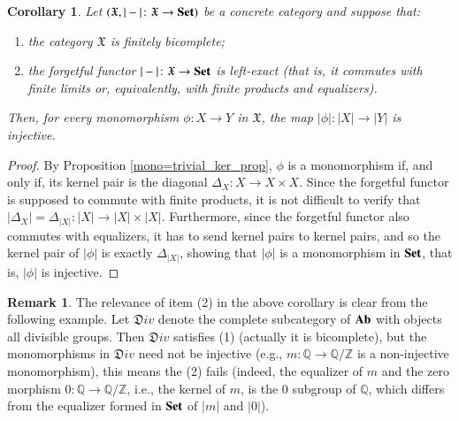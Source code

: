 \documentclass[12pt]{article}
\newtheorem{corollary}[lemma]{Corollary}
\theoremstyle{definition}
\newtheorem{remark}[lemma]{Remark}
\def\Z{\mathbb Z}
\def\Q{\mathbb Q}
\def\X{\mathfrak X}
\newcommand{\Set}{\textbf{\textup{Set}}}
\newcommand{\Ab}{\textbf{\textup{Ab}}}
\numberwithin{equation}{section}
\begin{document}
\begin{corollary}\label{mono_is_injective2}
Let $(\X,|-|\colon \X\to \Set)$ be a concrete category and suppose that:
\begin{enumerate}[\rm (1)]
\item the category $\X$ is finitely bicomplete; 
\item the forgetful functor $|-|\colon \X\to \Set$ is left-exact (that is, it commutes with finite limits or, equivalently, with finite products and equalizers).
\end{enumerate}
Then, for every monomorphism $\phi\colon X\to Y$ in $\X$, the map $|\phi|\colon |X|\to |Y|$ is injective.
\end{corollary}
\begin{proof}
By Proposition \ref{mono=trivial_ker_prop}, $\phi$ is a monomorphism if, and only if, its kernel pair is the diagonal $\Delta_X\colon X\to X\times X$. Since the forgetful functor is supposed to commute with finite products, it is not difficult to verify that $|\Delta_X|=\Delta_{|X|}\colon |X|\to |X|\times |X|$. Furthermore, since the forgetful functor also commutes with equalizers, it has to send kernel pairs to kernel pairs, and so the kernel pair of $|\phi|$ is exactly $\Delta_{|X|}$, showing that $|\phi|$ is a monomorphism in $\Set$, that is, $|\phi|$ is injective.
\end{proof}

\begin{remark}\label{Div:vs:left:adjoint2} 
The relevance of item (2) in the above corollary is clear from the following example. Let $\mathfrak D iv$ denote the complete subcategory of $\Ab$ 
with objects all divisible groups. Then $\mathfrak D iv$ satisfies (1) (actually it is bicomplete), but the monomorphisms in $\mathfrak D iv$ 
need not be injective (e.g., $m: \Q \to \Q/\Z$ is a non-injective monomorphism), this means the (2) fails (indeed, the equalizer of $m$ and the zero morphism $0: \Q \to \Q/\Z$, 
i.e., the kernel of $m$, is the 0 subgroup of $\Q$, which differs from the equalizer formed in $\Set$ of $|m|$ and $|0|$). 
 \end{remark}
\end{document}
